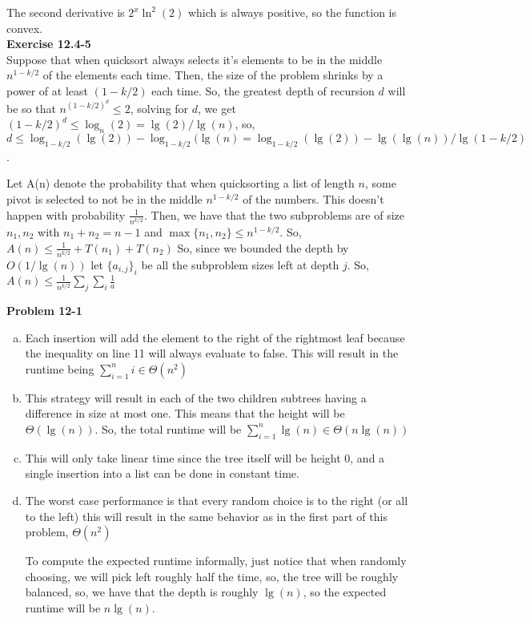 \documentclass{article}
\begin{document}
The second derivative is $2^x \ln^2(2)$ which is always positive, so the function is convex. \\

\noindent\textbf{ Exercise 12.4-5} \\

Suppose that when quicksort always selects it's elements to be in the middle $n^{1-k/2}$ of the elements each time. Then, the size of the problem shrinks by a power of at least $(1-k/2)$ each time. So, the greatest depth of recursion $d$ will be so that $n^{(1-k/2)^d} \le2$, solving for $d$, we get $(1-k/2)^d \le \log_n(2) = \lg(2)/\lg(n)$, so, $d \le \log_{1-k/2}(\lg(2)) - \log_{1-k/2}(\lg(n) = \log_{1-k/2}(\lg(2)) - \lg(\lg(n))/ \lg(1-k/2)$.

Let A(n) denote the probability that when quicksorting a list of length $n$, some pivot is selected to not be in  the middle $n^{1-k/2}$ of the numbers. This doesn't happen with probability $\frac{1}{n^{k/2}}$. Then, we have that the two subproblems are of size$n_1,n_2$ with $n_1+n_2 = n-1$ and $\max\{n_1,n_2\} \le n^{1-k/2}$. So, $A(n) \le \frac{1}{n^{k/2}} + T(n_1)+T(n_2)$ So, since we bounded the depth by $O(1/\lg(n))$ let $\{a_{i,j}\}_i$ be all the subproblem sizes left at depth $j$. So, $A(n) \le \frac{1}{n^{k/2}}\sum_{j} \sum_i \frac{1}{a}$

\noindent\textbf{Problem 12-1} \\

\begin{enumerate}[a.]
\item
Each insertion will add the element to the right of the rightmost leaf because the inequality on line 11 will always evaluate to false. This will result in the runtime being $\sum_{i=1}^n i \in \Theta(n^2)$

\item
This strategy will result in each of the two children subtrees having a difference in size at most one. This means that the height will be $\Theta(\lg(n))$. So, the total runtime will be $\sum_{i=1}^n \lg(n) \in \Theta(n\lg(n))$

\item
This will only take linear time since the tree itself will be height 0, and a single insertion into a list can be done in constant time.

\item
The worst case performance is that every random choice is to the right (or all to the left) this will result in the same behavior as in the first part of this problem, $\Theta(n^2)$

To compute the expected runtime informally, just notice that when randomly choosing, we will pick left roughly half the time, so, the tree will be roughly balanced, so, we have that the depth is roughly $\lg(n)$, so the expected runtime will be $n\lg(n)$.


\end{enumerate}
\end{document}

